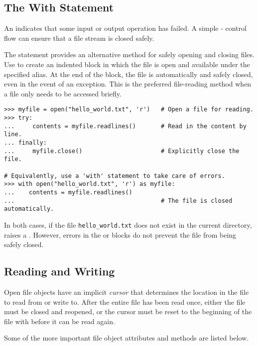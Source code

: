 \subsection*{The With Statement} %

An  indicates that some input or output operation has failed.
A simple - control flow can ensure that a file stream is closed safely.

The  statement provides an alternative method for safely opening and closing files.
Use  to create an indented block in which the file is open and available under the specified alias.
At the end of the block, the file is automatically and safely closed, even in the event of an exception.
This is the preferred file-reading method when a file only needs to be accessed briefly.

\begin{lstlisting}
>>> myfile = open("hello_world.txt", 'r')   # Open a file for reading.
>>> try:
...     contents = myfile.readlines()       # Read in the content by line.
... finally:
...     myfile.close()                      # Explicitly close the file.

# Equivalently, use a 'with' statement to take care of errors.
>>> with open("hello_world.txt", 'r') as myfile:
...    contents = myfile.readlines()
...                                         # The file is closed automatically.
\end{lstlisting}

In both cases, if the file \texttt{hello\_world.txt} does not exist in the current directory,  raises a .
However, errors in the  or  blocks do not prevent the file from being safely closed.

\subsection*{Reading and Writing} %

Open file objects have an implicit \emph{cursor} that determines the location in the file to read from or write to.
After the entire file has been read once, either the file must be closed and reopened, or the cursor must be reset to the beginning of the file with  before it can be read again.

Some of the more important file object attributes and methods are listed below.

